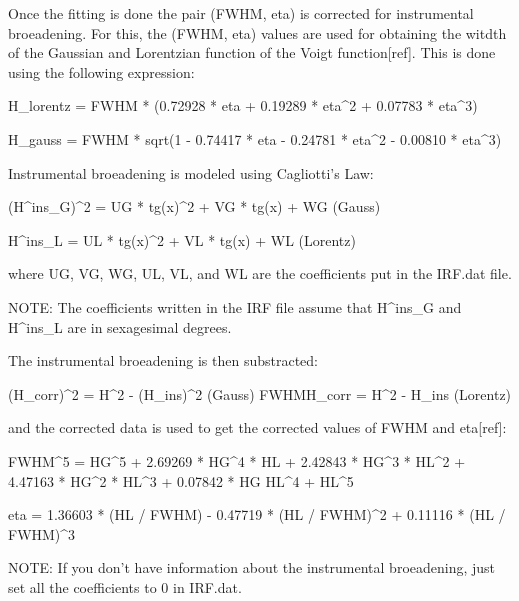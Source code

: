 Once the fitting is done the pair (FWHM, eta) is corrected for instrumental broeadening. For this, the (FWHM, eta) values are used for obtaining the witdth of
the Gaussian and Lorentzian function of the Voigt function[ref]. This is done using the following expression:

H_{lorentz} = FWHM * (0.72928 * eta + 0.19289 * eta^2 + 0.07783 * eta^3)

H_{gauss} = FWHM * sqrt(1 - 0.74417 * eta - 0.24781 * eta^2 - 0.00810 * eta^3)

Instrumental broeadening is modeled using Cagliotti's Law:

(H^ins_G)^2 = UG * tg(x)^2 + VG * tg(x) + WG (Gauss)

H^ins_L = UL * tg(x)^2 + VL * tg(x) + WL (Lorentz)

where UG, VG, WG, UL, VL, and WL are the coefficients put in the IRF.dat file.

NOTE: The coefficients written in the IRF file assume that H^ins_G and H^ins_L are in sexagesimal degrees.

The instrumental broeadening is then substracted:

(H_corr)^2 = H^2 - (H_ins)^2 (Gauss)
FWHMH_corr = H^2 - H_ins (Lorentz)

and the corrected data is used to get the corrected values of FWHM and eta[ref]:

FWHM^5 = HG^5 + 2.69269 * HG^4 * HL + 2.42843 * HG^3 * HL^2 + 4.47163 * HG^2 * HL^3 + 0.07842 * HG HL^4 + HL^5

eta = 1.36603 * (HL / FWHM) - 0.47719 * (HL / FWHM)^2 + 0.11116 * (HL / FWHM)^3

NOTE: If you don't have information about the instrumental broeadening, just set all the coefficients to 0 in IRF.dat.


